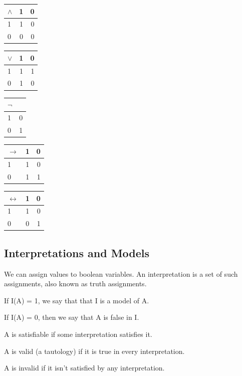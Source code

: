 \documentclass[11pt,a4paper]{article}
\begin{document}
\begin{tabular}{l | c r}
$\wedge$ & 1 & 0 \\
\hline
1 & 1 & 0 \\
0 & 0 & 0 \\
\end{tabular}
\hspace{5pt}
\begin{tabular}{l | c r}
$\vee$ & 1 & 0 \\
\hline
1 & 1 & 1 \\
0 & 1 & 0 \\
\end{tabular}
\hspace{5pt}
\begin{tabular}{l | c}
$\neg$ \\
\hline
1 & 0 \\
0 & 1 \\
\end{tabular}

\vspace{10pt}
\begin{tabular}{l | c r}
$\rightarrow$ & 1 & 0 \\
\hline
1 & 1 & 0 \\
0 & 1 & 1 \\
\end{tabular}
\hspace{5pt}
\begin{tabular}{l | c r}
$\leftrightarrow$ & 1 & 0 \\
\hline
1 & 1 & 0 \\
0 & 0 & 1 \\
\end{tabular}

\subsection{Interpretations and Models}

We can assign values to boolean variables.
An interpretation is a set of such assignments, also known as truth assignments.

If I(A) = 1, we say that that I is a model of A.

If I(A) = 0, then we say that A is false in I.

A is satisfiable if some interpretation satisfies it.

A is valid (a tautology) if it is true in every interpretation.

A is invalid if it isn't satisfied by any interpretation.
\end{document}
